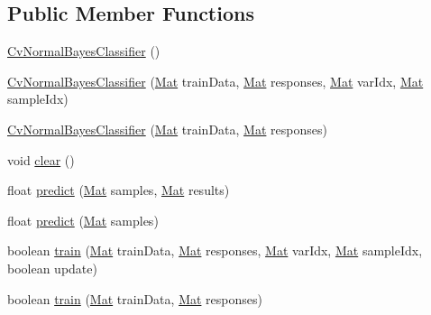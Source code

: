 \subsection*{Public Member Functions}
\begin{DoxyCompactItemize}
\item 
\mbox{\hyperlink{classorg_1_1opencv_1_1ml_1_1_cv_normal_bayes_classifier_a45d221f75ab929ee490df493ef604247}{Cv\+Normal\+Bayes\+Classifier}} ()
\item 
\mbox{\hyperlink{classorg_1_1opencv_1_1ml_1_1_cv_normal_bayes_classifier_a9d9bfab59a40a9f425fa3dd3e0572bc2}{Cv\+Normal\+Bayes\+Classifier}} (\mbox{\hyperlink{classorg_1_1opencv_1_1core_1_1_mat}{Mat}} train\+Data, \mbox{\hyperlink{classorg_1_1opencv_1_1core_1_1_mat}{Mat}} responses, \mbox{\hyperlink{classorg_1_1opencv_1_1core_1_1_mat}{Mat}} var\+Idx, \mbox{\hyperlink{classorg_1_1opencv_1_1core_1_1_mat}{Mat}} sample\+Idx)
\item 
\mbox{\hyperlink{classorg_1_1opencv_1_1ml_1_1_cv_normal_bayes_classifier_ad1f4ccb77cf4311804598fca4d7cd494}{Cv\+Normal\+Bayes\+Classifier}} (\mbox{\hyperlink{classorg_1_1opencv_1_1core_1_1_mat}{Mat}} train\+Data, \mbox{\hyperlink{classorg_1_1opencv_1_1core_1_1_mat}{Mat}} responses)
\item 
void \mbox{\hyperlink{classorg_1_1opencv_1_1ml_1_1_cv_normal_bayes_classifier_a87af297ad4ac9585a3a5c7ae25934058}{clear}} ()
\item 
float \mbox{\hyperlink{classorg_1_1opencv_1_1ml_1_1_cv_normal_bayes_classifier_a58960674387d3a7a1ea0b0cb544ab269}{predict}} (\mbox{\hyperlink{classorg_1_1opencv_1_1core_1_1_mat}{Mat}} samples, \mbox{\hyperlink{classorg_1_1opencv_1_1core_1_1_mat}{Mat}} results)
\item 
float \mbox{\hyperlink{classorg_1_1opencv_1_1ml_1_1_cv_normal_bayes_classifier_aa27915628eb042dc68ab7a1bd97b94f8}{predict}} (\mbox{\hyperlink{classorg_1_1opencv_1_1core_1_1_mat}{Mat}} samples)
\item 
boolean \mbox{\hyperlink{classorg_1_1opencv_1_1ml_1_1_cv_normal_bayes_classifier_a89391c9f8a1d8b796b83000e74f155e1}{train}} (\mbox{\hyperlink{classorg_1_1opencv_1_1core_1_1_mat}{Mat}} train\+Data, \mbox{\hyperlink{classorg_1_1opencv_1_1core_1_1_mat}{Mat}} responses, \mbox{\hyperlink{classorg_1_1opencv_1_1core_1_1_mat}{Mat}} var\+Idx, \mbox{\hyperlink{classorg_1_1opencv_1_1core_1_1_mat}{Mat}} sample\+Idx, boolean update)
\item 
boolean \mbox{\hyperlink{classorg_1_1opencv_1_1ml_1_1_cv_normal_bayes_classifier_a86c0843794fdedbf232894507a7abb24}{train}} (\mbox{\hyperlink{classorg_1_1opencv_1_1core_1_1_mat}{Mat}} train\+Data, \mbox{\hyperlink{classorg_1_1opencv_1_1core_1_1_mat}{Mat}} responses)
\end{DoxyCompactItemize}
